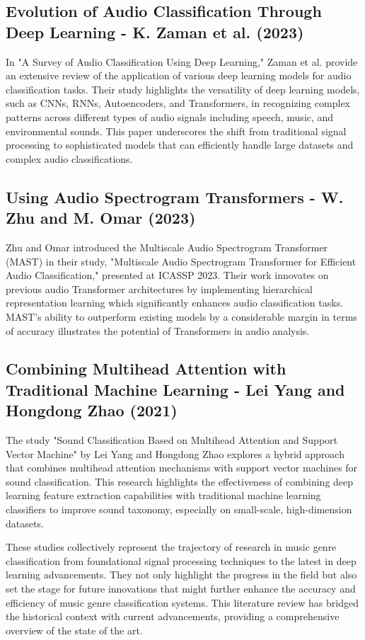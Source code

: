 \documentclass[lettersize,journal]{IEEEtran}
\begin{document}
\subsection{\textbf{Evolution of Audio Classification Through Deep Learning - K. Zaman et al. (2023)}}
    In "A Survey of Audio Classification Using Deep Learning," Zaman et al. provide an extensive review of the application of various deep learning models for audio classification tasks. Their study highlights the versatility of deep learning models, such as CNNs, RNNs, Autoencoders, and Transformers, in recognizing complex patterns across different types of audio signals including speech, music, and environmental sounds. This paper underscores the shift from traditional signal processing to sophisticated models that can efficiently handle large datasets and complex audio classifications.

\subsection{\textbf{Using Audio Spectrogram Transformers - W. Zhu and M. Omar (2023)}}
    Zhu and Omar introduced the Multiscale Audio Spectrogram Transformer (MAST) in their study, "Multiscale Audio Spectrogram Transformer for Efficient Audio Classification," presented at ICASSP 2023. Their work innovates on previous audio Transformer architectures by implementing hierarchical representation learning which significantly enhances audio classification tasks. MAST’s ability to outperform existing models by a considerable margin in terms of accuracy illustrates the potential of Transformers in audio analysis.

\subsection{\textbf{Combining Multihead Attention with Traditional Machine Learning - Lei Yang and Hongdong Zhao (2021)}}
    The study "Sound Classification Based on Multihead Attention and Support Vector Machine" by Lei Yang and Hongdong Zhao explores a hybrid approach that combines multihead attention mechanisms with support vector machines for sound classification. This research highlights the effectiveness of combining deep learning feature extraction capabilities with traditional machine learning classifiers to improve sound taxonomy, especially on small-scale, high-dimension datasets.
    
These studies collectively represent the trajectory of research in music genre classification from foundational signal processing techniques to the latest in deep learning advancements. They not only highlight the progress in the field but also set the stage for future innovations that might further enhance the accuracy and efficiency of music genre classification systems. This literature review has bridged the historical context with current advancements, providing a comprehensive overview of the state of the art.
\end{document}

